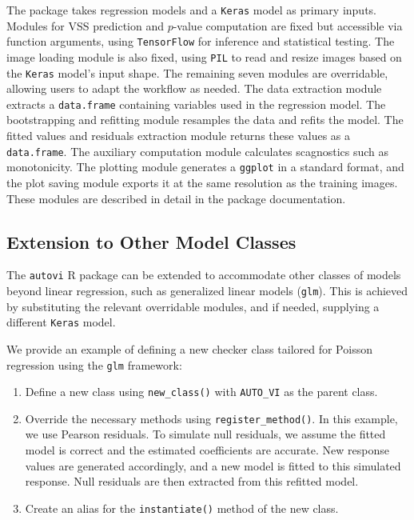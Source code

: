 \documentclass[
doublespace,
  times]{anzsauth}
\providecommand{\tightlist}{%
  \setlength{\itemsep}{0pt}\setlength{\parskip}{0pt}}\usepackage{longtable,booktabs,array}
\begin{document}
The package takes regression models and a \texttt{Keras} model as
primary inputs. Modules for VSS prediction and \(p\)-value computation
are fixed but accessible via function arguments, using
\texttt{TensorFlow} for inference and statistical testing. The image
loading module is also fixed, using \texttt{PIL} to read and resize
images based on the \texttt{Keras} model's input shape. The remaining
seven modules are overridable, allowing users to adapt the workflow as
needed. The data extraction module extracts a \texttt{data.frame}
containing variables used in the regression model. The bootstrapping and
refitting module resamples the data and refits the model. The fitted
values and residuals extraction module returns these values as a
\texttt{data.frame}. The auxiliary computation module calculates
scagnostics such as monotonicity. The plotting module generates a
\texttt{ggplot} in a standard format, and the plot saving module exports
it at the same resolution as the training images. These modules are
described in detail in the package documentation.

\subsection{Extension to Other Model
Classes}\label{extension-to-other-model-classes}

The \texttt{autovi} R package can be extended to accommodate other
classes of models beyond linear regression, such as generalized linear
models (\texttt{glm}). This is achieved by substituting the relevant
overridable modules, and if needed, supplying a different \texttt{Keras}
model.

We provide an example of defining a new checker class tailored for
Poisson regression using the \texttt{glm} framework:

\begin{enumerate}
\def\labelenumi{\arabic{enumi}.}
\tightlist
\item
  Define a new class using \texttt{new\_class()} with \texttt{AUTO\_VI}
  as the parent class.
\item
  Override the necessary methods using \texttt{register\_method()}. In
  this example, we use Pearson residuals. To simulate null residuals, we
  assume the fitted model is correct and the estimated coefficients are
  accurate. New response values are generated accordingly, and a new
  model is fitted to this simulated response. Null residuals are then
  extracted from this refitted model.
\item
  Create an alias for the \texttt{instantiate()} method of the new
  class.
\end{enumerate}
\end{document}
